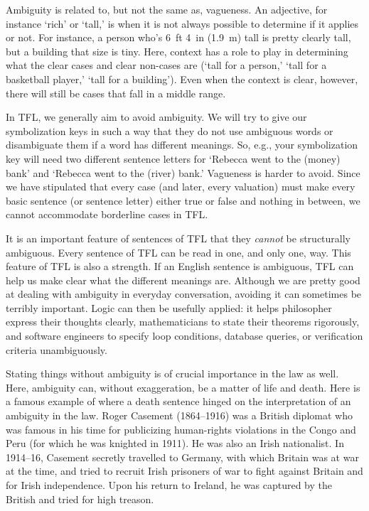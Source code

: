 Ambiguity is related to, but not the same as, vagueness. An adjective, for instance `rich' or `tall,' is  when it is not always possible to determine if it applies or not.  For instance, a person who's 6~ft 4~in (1.9~m) tall is pretty clearly tall, but a building that size is tiny.  Here, context has a role to play in determining what the clear cases and clear non-cases are (`tall for a person,' `tall for a basketball player,' `tall for a building'). Even when the context is clear, however, there will still be cases that fall in a middle range.

In TFL, we generally aim to avoid ambiguity. We will try to give our symbolization keys in such a way that they do not use ambiguous words or  disambiguate them if a word has different meanings. So, e.g., your symbolization key will need two different sentence letters for `Rebecca went to the (money) bank' and `Rebecca went to the (river) bank.' Vagueness is harder to avoid. Since we have stipulated that every case (and later, every valuation) must make every basic sentence (or sentence letter) either true or false and nothing in between, we cannot accommodate borderline cases in TFL.

It is an important feature of sentences of TFL that they \emph{cannot} be structurally ambiguous. Every sentence of TFL can be read in one, and only one, way. This feature of TFL is also a strength. If an English sentence is ambiguous, TFL can help us make clear what the different meanings are.  Although we are pretty good at dealing with ambiguity in everyday conversation, avoiding it can sometimes be terribly important. Logic can then be usefully applied: it helps philosopher express their thoughts clearly, mathematicians to state their theorems rigorously, and software engineers to specify loop conditions, database queries, or verification criteria unambiguously.

Stating things without ambiguity is of crucial importance in the law as well. Here, ambiguity can, without exaggeration, be a matter of life and death. Here is a famous example of where a death sentence hinged on the interpretation of an ambiguity in the law. Roger Casement (1864--1916) was a British diplomat who was famous in his time for publicizing human-rights violations in the Congo and Peru (for which he was knighted in 1911). He was also an Irish nationalist. In 1914--16, Casement secretly travelled to Germany, with which Britain was at war at the time, and tried to recruit Irish prisoners of war to fight against Britain and for Irish independence. Upon his return to Ireland, he was captured by the British and tried for high treason.

